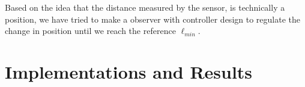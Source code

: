 \documentclass[a4paper,onecolumn,amsmath,amssymb]{revtex4-1}
\begin{document}
Based on the idea that the distance measured by the sensor, is technically a position, we have tried to make a observer with controller design to regulate the change in position until we reach the reference $\ell_{min}$.
\section{\textbf{Implementations and Results}}















































































 







 


 

 

 




























\begin{thebibliography}{99}

\end{thebibliography}
\end{document}
